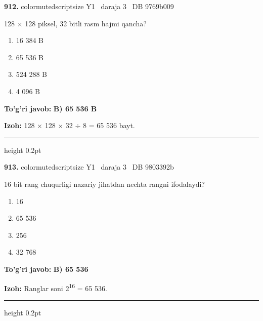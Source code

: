 \documentclass[10pt,a4paper,oneside]{article}
\begin{document}
\noindent\textbf{\color{ink}912.}  {color{muted}scriptsize Y1 \textbullet\ daraja 3 \textbullet\ DB 9769b009}
\par
128 \ensuremath{\times} 128 piksel, 32 bitli rasm hajmi qancha?
\begin{enumerate}[label=\Alph*),leftmargin=9mm]
\item 16 384 B
\item 65 536 B
\item 524 288 B
\item 4 096 B
\end{enumerate}
\begin{tcolorbox}[enhanced,breakable,colback=teal!4,colframe=teal!50!black,boxrule=0.5pt,arc=1.1mm,left=3mm,right=3mm,top=1.7mm,bottom=1.7mm,before skip=2mm,after skip=2mm]
\textbf{\color{teal}To'g'ri javob:} \textbf{B) 65 536 B}
\par\smallskip
\textbf{Izoh:} 128 \ensuremath{\times} 128 \ensuremath{\times} 32 \ensuremath{\div} 8 = 65 536 bayt.
\end{tcolorbox}
\vspace{2mm}\hrule height 0.2pt \vspace{3mm}

\noindent\textbf{\color{ink}913.}  {color{muted}scriptsize Y1 \textbullet\ daraja 3 \textbullet\ DB 9803392b}
\par
16 bit rang chuqurligi nazariy jihatdan nechta rangni ifodalaydi?
\begin{enumerate}[label=\Alph*),leftmargin=9mm]
\item 16
\item 65 536
\item 256
\item 32 768
\end{enumerate}
\begin{tcolorbox}[enhanced,breakable,colback=teal!4,colframe=teal!50!black,boxrule=0.5pt,arc=1.1mm,left=3mm,right=3mm,top=1.7mm,bottom=1.7mm,before skip=2mm,after skip=2mm]
\textbf{\color{teal}To'g'ri javob:} \textbf{B) 65 536}
\par\smallskip
\textbf{Izoh:} Ranglar soni 2\textsuperscript{1}\textsuperscript{6} = 65 536.
\end{tcolorbox}
\vspace{2mm}\hrule height 0.2pt \vspace{3mm}
\end{document}
